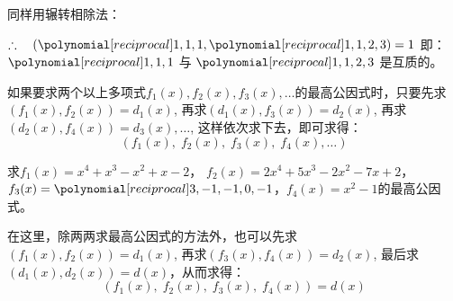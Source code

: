 \begin{solution}
同样用辗转相除法：
\begin{center}

\end{center}

$\therefore\quad (\poly{1,1,1}, \poly{1,1,2,3})=1$
即：$\poly{1,1,1}$ 与 $\poly{1,1,2,3}$ 是互质的。

\end{solution}

如果要求两个以上多项式$f_1(x),f_2(x),f_3(x),\ldots$的最高公因式时，只要先求$(f_1(x),f_2(x))=d_1(x)$, 再求$(d_1(x),f_3(x))=d_2(x)$, 再求$(d_2(x), f_4 (x))=d_3(x),\ldots$, 这样依次求下去，即可求得：
\[(f_1 (x),\; f_2 (x),\; f_3 (x),\; f_4(x),\ldots)\]


\begin{example}
求$f_1(x)=x^4+x^3-x^2+x-2$，
$f_2 (x) =2x^4+5x^3-2x^2-7x+2$，$f_3(x)=\poly{3,-1,-1,0,-1}$，$f_4(x)=x^2-1$的最高公因式。
\end{example}

\begin{note}
在这里，除两两求最高公因式的方法外，也可以先求$(f_1(x),f_2(x))=d_1(x)$, 再求$(f_3(x), f_4(x))=d_2(x)$, 最后求$(d_1(x),d_2(x))=d(x)$，从而求得：
\[(f_1 (x) ,\; f_2 (x),\; f_3 (x),\; f_4 (x)) =d(x)\]
\end{note}

